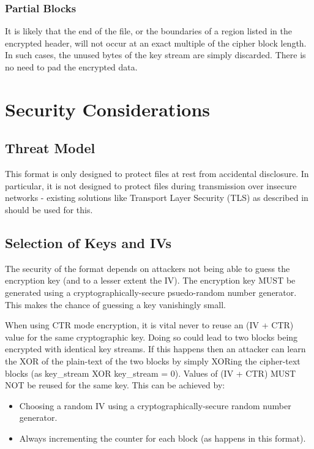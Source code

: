 \documentclass[10pt]{article}
\begin{document}
\subsubsection{Partial Blocks}
It is likely that the end of the file, or the boundaries of a region listed in the encrypted header, will not occur at
an exact multiple of the cipher block length.
In such cases, the unused bytes of the key stream are simply discarded.
There is no need to pad the encrypted data.

\section{Security Considerations}
\subsection{Threat Model}
This format is only designed to protect files at rest from accidental disclosure.
In particular, it is not designed to protect files during transmission over insecure networks - existing solutions like
Transport Layer Security (TLS) as described in \cite{RFC5246} should be used for this.

\subsection{Selection of Keys and IVs}
The security of the format depends on attackers not being able to guess the encryption key (and to a lesser extent the
IV).
The encryption key MUST be generated using a cryptographically-secure psuedo-random number generator.
This makes the chance of guessing a key vanishingly small.

When using CTR mode encryption, it is vital never to reuse an (IV + CTR) value for the same cryptographic key.
Doing so could lead to two blocks being encrypted with identical key streams.
If this happens then an attacker can learn the XOR of the plain-text of the two blocks by simply XORing the cipher-text
blocks (as key\_stream XOR key\_stream = 0).
Values of (IV + CTR) MUST NOT be reused for the same key.
This can be achieved by:

\begin{itemize}
\item Choosing a random IV using a cryptographically-secure random number generator.
\item Always incrementing the counter for each block (as happens in this format).
\end{itemize}
\end{document}
